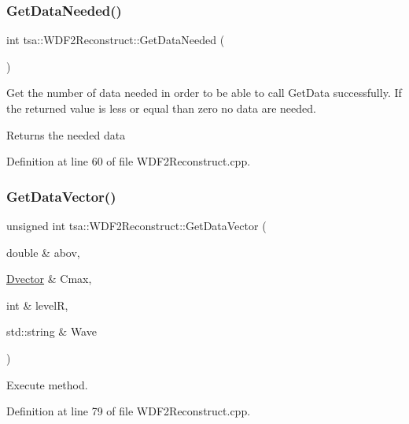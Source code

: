 \subsubsection{\texorpdfstring{Get\+Data\+Needed()}{GetDataNeeded()}}
{\footnotesize\ttfamily int tsa\+::\+W\+D\+F2\+Reconstruct\+::\+Get\+Data\+Needed (\begin{DoxyParamCaption}{ }\end{DoxyParamCaption})}

Get the number of data needed in order to be able to call Get\+Data successfully. If the returned value is less or equal than zero no data are needed.

\begin{DoxyReturn}{Returns}
the needed data 
\end{DoxyReturn}


Definition at line 60 of file W\+D\+F2\+Reconstruct.\+cpp.

\mbox{\label{classtsa_1_1_w_d_f2_reconstruct_a59a5db57e65ecb9abf0b822f55d057af}} 
\subsubsection{\texorpdfstring{Get\+Data\+Vector()}{GetDataVector()}}
{\footnotesize\ttfamily unsigned int tsa\+::\+W\+D\+F2\+Reconstruct\+::\+Get\+Data\+Vector (\begin{DoxyParamCaption}\item[{double \&}]{abov,  }\item[{\hyperlink{namespacetsa_a8900fb03d849baf447a1a0efe2561fb2}{Dvector} \&}]{Cmax,  }\item[{int \&}]{levelR,  }\item[{std\+::string \&}]{Wave }\end{DoxyParamCaption})}



Execute method. 



Definition at line 79 of file W\+D\+F2\+Reconstruct.\+cpp.

\mbox{\label{classtsa_1_1_w_d_f2_reconstruct_a668e1f73d039c21b0905f364be83682c}} 
